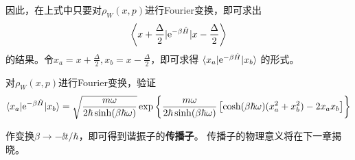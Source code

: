     因此，在上式中只要对\(\rho_W(x, p)\)进行Fourier变换，即可求出
    \[
        \left< x + \frac{\Delta}{2} | \mathrm{e}^{-\beta\hat{H}} | x - \frac{\Delta}{2} \right>
    \]
    的结果。令\(x_a = x + \frac{\Delta}{2}, x_b = x - \frac{\Delta}{2}\)，即可求得
    \(
        \braket{x_a | \mathrm{e}^{-\beta \hat{H}} | x_b}
    \)
    的形式。
    
    \begin{asg}
        对\(\rho_W(x, p)\)进行Fourier变换，验证
        \[
            \braket{x_a | \mathrm{e}^{-\beta\hat{H}} | x_b} = 
            \sqrt{\frac{m\omega}{2\hbar\sinh(\beta\hbar\omega)}} 
            \exp\left\{\frac{m\omega}{2\hbar\sinh(\beta\hbar\omega)} 
            \left[\cosh(\beta\hbar\omega)(x_a^2 + x_b^2) - 2x_a x_b\right]\right\}
        \]
    \end{asg}
    
    作变换\(\beta \rightarrow -\ii t / \hbar\)，即可得到谐振子的\textbf{传播子}。
    传播子的物理意义将在下一章揭晓。


    

    
    